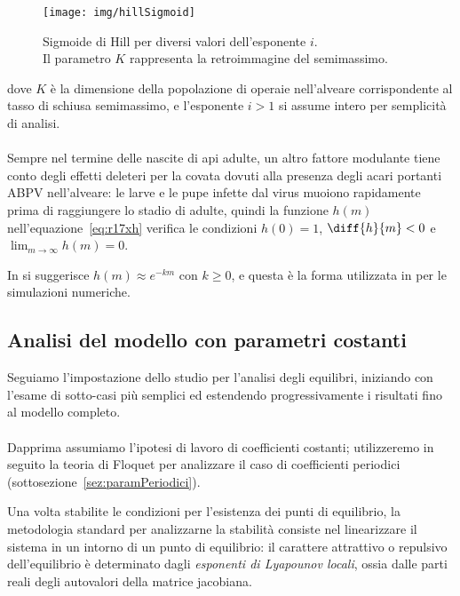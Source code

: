 \begin{figure}
    \centering
    \texttt{[image: img/hillSigmoid]}

    \caption[Sigmoidi di Hill.]{Sigmoide di Hill per diversi valori dell'esponente $i$.
        \\ Il parametro $K$ rappresenta la retroimmagine del semimassimo.}
    \label{img:hillSigmoid}
\end{figure}

dove $K$ è la dimensione della popolazione di operaie nell'alveare corrispondente al tasso di schiusa semimassimo, e l'esponente $i>1$ si assume intero per semplicità di analisi.

\paragraph{}
Sempre nel termine delle nascite di api adulte, un altro fattore modulante tiene conto degli effetti deleteri per la covata dovuti alla presenza degli acari portanti ABPV nell'alveare: le larve e le pupe infette dal virus muoiono rapidamente prima di raggiungere lo stadio di adulte, quindi la funzione $h(m)$ nell'equazione~\ref{eq:r17xh} verifica le condizioni $h(0)=1$, $\diff{h}{m} <0$ e $\lim_{m \to \infty} h(m) = 0$.

In \cite{sumMar04} si suggerisce $h(m) \approx e^{-km}$ con $k\geq0$, e questa è la forma utilizzata in \cite{ratti2017} per le simulazioni numeriche.


\subsection{Analisi del modello con parametri costanti}
Seguiamo l'impostazione dello studio \cite{ratti2017} per l'analisi degli equilibri, iniziando con l'esame di sotto-casi più semplici ed estendendo progressivamente i risultati fino al modello completo.

\paragraph{}
Dapprima assumiamo l'ipotesi di lavoro di coefficienti costanti; utilizzeremo in seguito la teoria di Floquet per analizzare il caso di coefficienti periodici (sottosezione~\ref{sez:paramPeriodici}).

Una volta stabilite le condizioni per l'esistenza dei punti di equilibrio, la metodologia standard per analizzarne la stabilità consiste nel linearizzare il sistema in un intorno di un punto di equilibrio: il carattere attrattivo o repulsivo dell'equilibrio è determinato dagli \emph{esponenti di Lyapounov locali}, ossia dalle parti reali degli autovalori della matrice jacobiana.

